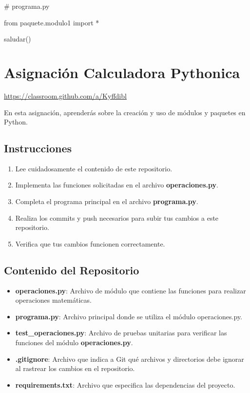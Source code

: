 \documentclass[
  a4paper,
  DIV=11,
  numbers=noendperiod,
  onepage,
  openany]{scrreprt}
\newenvironment{Shaded}{\begin{snugshade}}{\end{snugshade}}
\newcommand{\CommentTok}[1]{\textcolor[rgb]{0.37,0.37,0.37}{#1}}
\newcommand{\ImportTok}[1]{\textcolor[rgb]{0.00,0.46,0.62}{#1}}
\newcommand{\NormalTok}[1]{\textcolor[rgb]{0.00,0.23,0.31}{#1}}
\newcommand{\OperatorTok}[1]{\textcolor[rgb]{0.37,0.37,0.37}{#1}}
\providecommand{\tightlist}{%
  \setlength{\itemsep}{0pt}\setlength{\parskip}{0pt}}\usepackage{longtable,booktabs,array}
\begin{document}
\begin{tcolorbox}
\begin{Shaded}
\begin{Highlighting}[]
\CommentTok{\# programa.py}

\ImportTok{from}\NormalTok{ paquete.modulo1 }\ImportTok{import} \OperatorTok{*}

\NormalTok{saludar()}
\end{Highlighting}
\end{Shaded}

\chapter{Asignación Calculadora
Pythonica}\label{asignaciuxf3n-calculadora-pythonica}

\url{https://classroom.github.com/a/Kyffdibl}

En esta asignación, aprenderás sobre la creación y uso de módulos y
paquetes en Python.

\section{Instrucciones}\label{instrucciones-1}

\begin{enumerate}
\def\labelenumi{\arabic{enumi}.}
\tightlist
\item
  Lee cuidadosamente el contenido de este repositorio.
\item
  Implementa las funciones solicitadas en el archivo
  \textbf{operaciones.py}.
\item
  Completa el programa principal en el archivo \textbf{programa.py}.
\item
  Realiza los commits y push necesarios para subir tus cambios a este
  repositorio.
\item
  Verifica que tus cambios funcionen correctamente.
\end{enumerate}

\section{Contenido del Repositorio}\label{contenido-del-repositorio-1}

\begin{itemize}
\tightlist
\item
  \textbf{operaciones.py}: Archivo de módulo que contiene las funciones
  para realizar operaciones matemáticas.
\item
  \textbf{programa.py}: Archivo principal donde se utiliza el módulo
  operaciones.py.
\item
  \textbf{test\_operaciones.py}: Archivo de pruebas unitarias para
  verificar las funciones del módulo \textbf{operaciones.py}.
\item
  \textbf{.gitignore}: Archivo que indica a Git qué archivos y
  directorios debe ignorar al rastrear los cambios en el repositorio.
\item
  \textbf{requirements.txt}: Archivo que especifica las dependencias del
  proyecto.
\end{itemize}


\end{tcolorbox}
\end{document}
